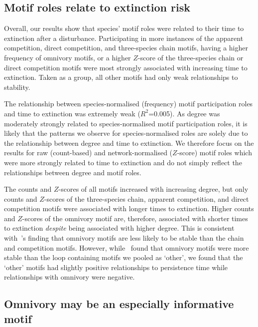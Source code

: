 \documentclass[12pt]{article}
\begin{document}
\begin{spacing}{2.0}
	\subsection*{Motif roles relate to extinction risk}

		Overall, our results show that species' motif roles were related to their time to extinction after a disturbance.
		Participating in more instances of the apparent competition, direct competition, and three-species chain motifs, having a higher frequency of omnivory motifs, or a higher $Z$-score of the three-species chain or direct competition motifs were most strongly associated with increasing time to extinction.
        Taken as a group, all other motifs had only weak relationships to stability.


        The relationship between species-normalised (frequency) motif participation roles and time to extinction was extremely weak ($R^2$=0.005).
        As degree was moderately strongly related to species-normalised motif participation roles, it is likely that the patterns we observe for species-normalised roles are solely due to the relationship between degree and time to extinction.
        We therefore focus on the results for raw (count-based) and network-normalised ($Z$-score) motif roles which were more strongly related to time to extinction and do not simply reflect the relationships between degree and motif roles.


        The counts and $Z$-scores of all motifs increased with increasing degree, but only counts and $Z$-scores of the three-species chain, apparent competition, and direct competition motifs were associated with longer times to extinction. 
        Higher counts and $Z$-scores of the omnivory motif are, therefore, associated with shorter times to extinction \emph{despite} being associated with higher degree.
        This is consistent with~\citet{Borrelli2015a}'s finding that omnivory motifs are less likely to be stable than the chain and competition motifs.
        However, while~\citep{Borrelli2015a} found that omnivory motifs were more stable than the loop containing motifs we pooled as `other', we found that the `other' motifs had slightly positive relationships to persistence time while relationships with omnivory were negative.

        
    \subsection*{Omnivory may be an especially informative motif}
	    

\end{spacing}
\end{document}
